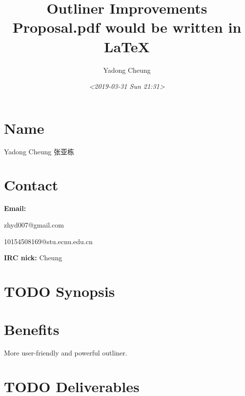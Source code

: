 \documentclass[11pt]{article}
\author{Yadong Cheung}
\date{\textit{<2019-03-31 Sun 21:31>}}
\title{Outliner Improvements\\\medskip
\large Proposal.pdf would be written in \LaTeX}
\begin{document}
\maketitle


\section*{Name}
\label{sec:orgfdc24c8}
Yadong Cheung 张亚栋

\section*{Contact}
\label{sec:org32b15e3}
\textbf{Email:}

zhyd007@gmail.com

10154508169@stu.ecnu.edu.cn

\textbf{IRC nick:} Cheung

\section*{{\bfseries\sffamily TODO} Synopsis}
\label{sec:org8f7978b}

\section*{Benefits}
\label{sec:orgec97abd}
More user-friendly and powerful outliner.

\section*{{\bfseries\sffamily TODO} Deliverables}
\label{sec:org09d249c}
\end{document}
